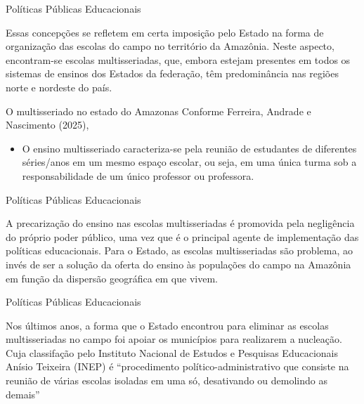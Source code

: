 \documentclass[12pt]{beamer}
\begin{document}
		\begin{frame}{Políticas Públicas Educacionais}
			\justifying
			
			Essas concepções se refletem em certa imposição pelo Estado na forma de organização das escolas do campo no território da Amazônia. Neste aspecto, encontram-se escolas multisseriadas, que, embora estejam presentes em todos os sistemas de ensinos dos Estados da federação, têm predominância nas regiões norte e nordeste do país.
		\end{frame}
		
		\begin{frame}{O multisseriado no estado do Amazonas}
			\justifying
			Conforme Ferreira, Andrade e Nascimento (2025),
			\begin{itemize}
				\item O  ensino  multisseriado  caracteriza-se  pela  reunião  de  estudantes  de diferentes  séries/anos  em  um  mesmo  espaço  escolar,  ou  seja,  em  uma  única turma sob a responsabilidade de um único professor ou professora.
				
				
			\end{itemize}
		\end{frame}
		
		\begin{frame}{Políticas Públicas Educacionais}
			\justifying
			
			A precarização do ensino nas escolas multisseriadas é promovida pela
			negligência do próprio poder público, uma vez que é o principal agente de
			implementação das políticas educacionais. Para o Estado, as escolas multisseriadas
			são problema, ao invés de ser a solução da oferta do ensino às populações do
			campo na Amazônia em função da dispersão geográfica em que vivem. 
		\end{frame}
		
		\begin{frame}{Políticas Públicas Educacionais}
			\justifying
			
			 Nos últimos anos, a forma que o Estado encontrou para eliminar as escolas multisseriadas no campo foi apoiar os municípios para realizarem a nucleação. Cuja classifação pelo Instituto Nacional de Estudos e Pesquisas Educacionais Anísio Teixeira (INEP) é “procedimento político-administrativo que consiste na reunião de várias escolas isoladas em uma só, desativando ou demolindo as demais”
		\end{frame}
		
\end{document}

